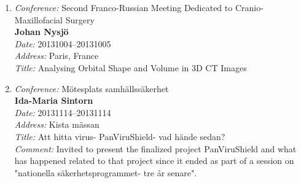 \begin{enumerate}
\item 
{\em Conference:} Second Franco-Russian Meeting Dedicated to Cranio-Maxillofacial Surgery~\\
{\bf Johan Nysj\"{o}}\\
{\em Date:} 20131004--20131005~\\
{\em Address:} Paris, France~\\
{\em Title:} Analysing Orbital Shape and Volume in 3D CT Images

\item 
{\em Conference:} M\"{o}tesplats samh\"{a}llss\"{a}kerhet~\\
{\bf Ida-Maria Sintorn}~\\
{\em Date:} 20131114--20131114~\\
{\em Address:} Kista m\"{a}ssan~\\
{\em Title:} Att hitta virus- PanViruShield- vad h\"{a}nde sedan?~\\
{\em Comment:} Invited to present the finalized project PanViruShield and what has happened related to that project since it ended as part of a session on "nationella s\"{a}kerhetsprogrammet- tre {\aa}r senare".

\end{enumerate}

